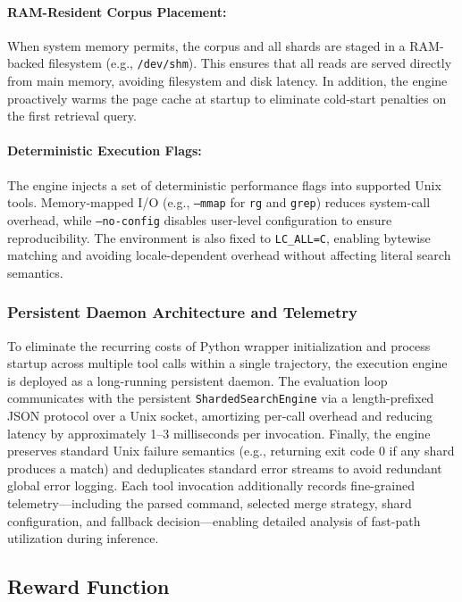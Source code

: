 \documentclass{article} %
\begin{document}
\paragraph{RAM-Resident Corpus Placement:} When system memory permits, the corpus and all shards are staged in a RAM-backed filesystem (e.g., \texttt{/dev/shm}). This ensures that all reads are served directly from main memory, avoiding filesystem and disk latency. In addition, the engine proactively warms the page cache at startup to eliminate cold-start penalties on the first retrieval query.

\paragraph{Deterministic Execution Flags:} The engine injects a set of deterministic performance flags into supported Unix tools. Memory-mapped I/O (e.g., \texttt{--mmap} for \texttt{rg} and \texttt{grep}) reduces system-call overhead, while \texttt{--no-config} disables user-level configuration to ensure reproducibility. The environment is also fixed to \texttt{LC\_ALL=C}, enabling bytewise matching and avoiding locale-dependent overhead without affecting literal search semantics.

\subsubsection{Persistent Daemon Architecture and Telemetry}

To eliminate the recurring costs of Python wrapper initialization and process startup across multiple tool calls within a single trajectory, the execution engine is deployed as a long-running persistent daemon. The evaluation loop communicates with the persistent \texttt{ShardedSearchEngine} via a length-prefixed JSON protocol over a Unix socket, amortizing per-call overhead and reducing latency by approximately 1--3 milliseconds per invocation. Finally, the engine preserves standard Unix failure semantics (e.g., returning exit code 0 if any shard produces a match) and deduplicates standard error streams to avoid redundant global error logging. Each tool invocation additionally records fine-grained telemetry---including the parsed command, selected merge strategy, shard configuration, and fallback decision---enabling detailed analysis of fast-path utilization during inference.





\subsection{Reward Function}
\label{app:reward}
\end{document}
